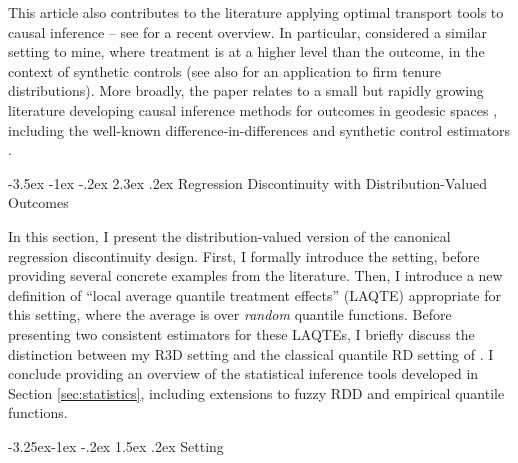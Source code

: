 \documentclass[12pt]{article}
\makeatletter
\renewcommand\section{\@startsection{section}{1}{\z@}%
  {-3.5ex \@plus -1ex \@minus -.2ex}%
  {2.3ex \@plus.2ex}%
  {\bfseries\large\center}} %
\renewcommand\subsection{\@startsection{subsection}{2}{\z@}%
  {-3.25ex\@plus -1ex \@minus -.2ex}%
  {1.5ex \@plus .2ex}%
  {\itshape\large\center}} %
\makeatother
\begin{document}
This article also contributes to the literature applying optimal transport tools to causal inference -- see \citet{gunsilius2025primer} for a recent overview. In particular, \citet{gunsilius2023distributional} considered a similar setting to mine, where treatment is at a higher level than the outcome, in the context of synthetic controls (see also \citet{van2024return} for an application to firm tenure distributions). More broadly, the paper relates to a small but rapidly growing literature developing causal inference methods for outcomes in geodesic spaces \citep{kurisu2024geodesic, lin2023causal, katta2024interpretable}, including the   well-known difference-in-differences \citep{athey2006identification, torous2024optimal, callaway2018quantile, callaway2019quantile, ghanem2023evaluating, zhou2025geodesic} and synthetic control estimators \citep{kurisu2025geodesic, gunsilius2024tangential}. 



\section{Regression Discontinuity with Distribution-Valued Outcomes}

In this section, I present the distribution-valued version of the canonical regression discontinuity design. First, I formally introduce the setting, before providing several concrete examples from the literature. Then, I introduce a new definition of ``local average quantile treatment effects'' (LAQTE) appropriate for this setting, where the average is over \emph{random} quantile functions. Before presenting two consistent estimators for these LAQTEs, I briefly discuss the distinction between my R3D setting and the classical quantile RD setting of \citet{frandsen2012quantile}. I conclude providing an overview of the statistical inference tools developed in Section \ref{sec:statistics}, including extensions to fuzzy RDD and empirical quantile functions. 


\subsection{Setting}
\end{document}
